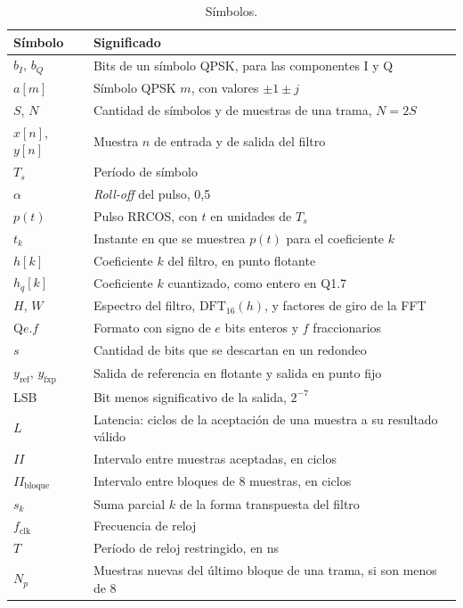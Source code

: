 \begin{table}[h]
  \centering
  \caption{Símbolos.}\label{tab:glosario}
  \begin{tabular}{ll}
    \toprule
    Símbolo & Significado \\
    \midrule
    $b_I$, $b_Q$ & Bits de un símbolo QPSK, para las componentes I y Q \\
    $a[m]$ & Símbolo QPSK $m$, con valores $\pm1 \pm j$ \\
    $S$, $N$ & Cantidad de símbolos y de muestras de una trama, $N = 2S$ \\
    $x[n]$, $y[n]$ & Muestra $n$ de entrada y de salida del filtro \\
    $T_s$ & Período de símbolo \\
    $\alpha$ & \emph{Roll-off} del pulso, 0,5 \\
    $p(t)$ & Pulso RRCOS, con $t$ en unidades de $T_s$ \\
    $t_k$ & Instante en que se muestrea $p(t)$ para el coeficiente $k$ \\
    $h[k]$ & Coeficiente $k$ del filtro, en punto flotante \\
    $h_q[k]$ & Coeficiente $k$ cuantizado, como entero en Q1.7 \\
    $H$, $W$ & Espectro del filtro, $\mathrm{DFT}_{16}(h)$, y factores de giro de la FFT \\
    Q$e.f$ & Formato con signo de $e$ bits enteros y $f$ fraccionarios \\
    $s$ & Cantidad de bits que se descartan en un redondeo \\
    $y_\mathrm{ref}$, $y_\mathrm{fxp}$ & Salida de referencia en flotante y salida en punto fijo \\
    LSB & Bit menos significativo de la salida, $2^{-7}$ \\
    $L$ & Latencia: ciclos de la aceptación de una muestra a su resultado válido \\
    $II$ & Intervalo entre muestras aceptadas, en ciclos \\
    $II_\text{bloque}$ & Intervalo entre bloques de 8 muestras, en ciclos \\
    $s_k$ & Suma parcial $k$ de la forma transpuesta del filtro \\
    $f_\text{clk}$ & Frecuencia de reloj \\
    $T$ & Período de reloj restringido, en ns \\
    $N_p$ & Muestras nuevas del último bloque de una trama, si son menos de 8 \\
    \bottomrule
  \end{tabular}
\end{table}
